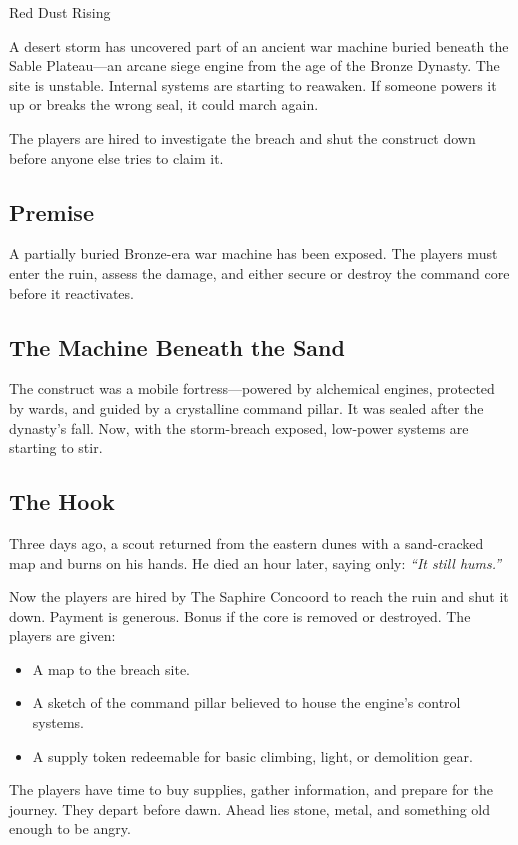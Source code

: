 
\begin{WyrdScenarioHeading}{Red Dust Rising}
	\label{scenario:red-dust-rising}

	A desert storm has uncovered part of an ancient war machine buried beneath the Sable Plateau—an arcane siege engine from the age of the Bronze Dynasty. The site is unstable. Internal systems are starting to reawaken. If someone powers it up or breaks the wrong seal, it could march again.

	The players are hired to investigate the breach and shut the construct down before anyone else tries to claim it.

	\subsection*{Premise}
	A partially buried Bronze-era war machine has been exposed. The players must enter the ruin, assess the damage, and either secure or destroy the command core before it reactivates.

	\subsection*{The Machine Beneath the Sand}
	The construct was a mobile fortress—powered by alchemical engines, protected by wards, and guided by a crystalline command pillar. It was sealed after the dynasty’s fall. Now, with the storm-breach exposed, low-power systems are starting to stir.

	\subsection*{The Hook}
	Three days ago, a scout returned from the eastern dunes with a sand-cracked map and burns on his hands. He died an hour later, saying only: \emph{“It still hums.”}

	Now the players are hired by The Saphire Concoord to reach the ruin and shut it down. Payment is generous. Bonus if the core is removed or destroyed. The players are given:
	\begin{itemize}
	    \item A map to the breach site.
	    \item A sketch of the command pillar believed to house the engine’s control systems.
	    \item A supply token redeemable for basic climbing, light, or demolition gear.
	\end{itemize}

    The players have time to buy supplies, gather information, and prepare for the journey. They depart before dawn. Ahead lies stone, metal, and something old enough to be angry.
\end{WyrdScenarioHeading}


